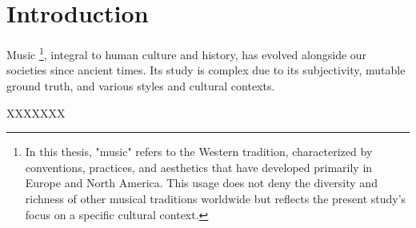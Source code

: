 \chapter{Introduction}

Music \footnote{In this thesis, "music" refers to the Western tradition, characterized by conventions, practices, and aesthetics that have developed primarily in Europe and North America. This usage does not deny the diversity and richness of other musical traditions worldwide but reflects the present study's focus on a specific cultural context.}, integral to human culture and history, has evolved alongside our societies since ancient times. Its study is complex due to its subjectivity, mutable ground truth, and various styles and cultural contexts.

XXXXXXX